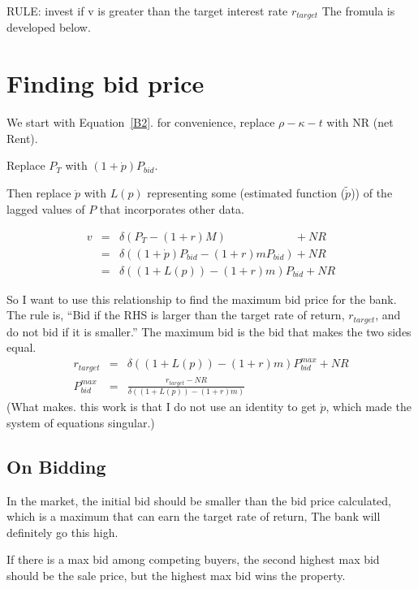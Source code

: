 RULE: invest if v is greater than  the  target interest rate $r_{target}$            The fromula is developed below.



\section{Finding bid price}
We start with Equation~\ref{B2}. for convenience, replace $\rho   	-\kappa - t $ with NR (net Rent). 

Replace $P_T$ with $(1+\dot p)P_{bid}$.

Then replace   $\dot p$ with $L(p)$ representing some (estimated function ($\tilde{\dot p}$)) of the lagged values of $P$ that incorporates other data. 

\begin{eqnarray}
v&=& \delta(P_T- (1+r)M) \qquad \qquad \qquad 	 + NR \nonumber\\
 &=&\delta\left( (1+\dot p)P_{bid} - (1+r)mP_{bid} \right)  + NR  \nonumber\\
  &=&\delta\left( (1+L(p)) - (1+r)m \right) P_{bid} + NR  \nonumber
\end{eqnarray}


So I want to use this relationship to find the maximum bid price for the bank. The rule is, ``Bid if the RHS is larger than the target rate of return, $r_{target}$, and do not bid if it is smaller.''  The maximum bid  is the bid that makes the two sides equal. 
\begin{eqnarray}
r_{target}&=& \delta\left( (1+L(p)) - (1+r)m \right) P^{max}_{bid} + NR  \nonumber\\
   P^{max}_{bid} &=&\frac{r_{target}-NR}{\delta\left( (1+L(p)) - (1+r)m \right)} \label{EqBidPrice} 
\end{eqnarray}
(What makes. this work is that I do not use an identity to get
$\dot p$, which made the system of equations singular.)
\newpage

\subsection{ On Bidding}

In the market, the initial bid should be smaller than the bid price calculated, which is a maximum that can earn the target rate of return, The bank will definitely go this high. 

If there is a  max bid among competing buyers, the second highest max bid should be the sale price, but the highest max bid wins the property.

